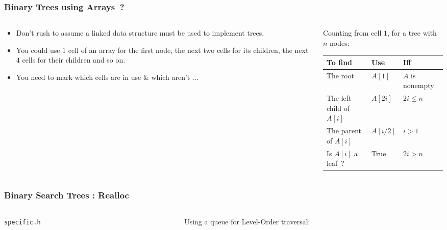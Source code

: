 
\begin{frame}[fragile]
\frametitle{Binary Trees using Arrays~?}
\begin{columns}[T]

\begin{column}{0.35\textwidth}
\begin{itemize}[<+->]
\item Don't rush to assume a linked data structure must be used to
implement trees.
\item You could use $1$ cell of an array for the
first node, the next two cells for its children, the next $4$
cells for their children and so on.
\item You need to mark which cells are in use \& which aren't ...
\end{itemize}
\end{column}

\pause
\begin{column}{0.55\textwidth}
Counting from cell $1$, for a tree with $n$ nodes:
\begin{center}	
\begin{tabular}{|l|l|l|}\hline	
To find & Use & Iff\\ \hline	
The root & $A[1]$ & $A$ is nonempty \\	
The left child of $A[i]$ & $A[2i]$ & $2i \leq n$ \\	
The parent of $A[i]$ & $A[i/2]$ & $i > 1$\\	
Is $A[i]$ a leaf~? & True & $2i > n$\\ \hline	
\end{tabular}	
\end{center}	
\end{column}

\end{columns}
\end{frame}


\begin{frame}[fragile]
\frametitle{Binary Search Trees : Realloc}
\begin{columns}[T]

\begin{column}{0.45\textwidth}
\verb^specific.h^

\end{column}

\pause
\begin{column}{0.45\textwidth}
Using a queue for Level-Order traversal:

\end{column}

\end{columns}
\end{frame}


